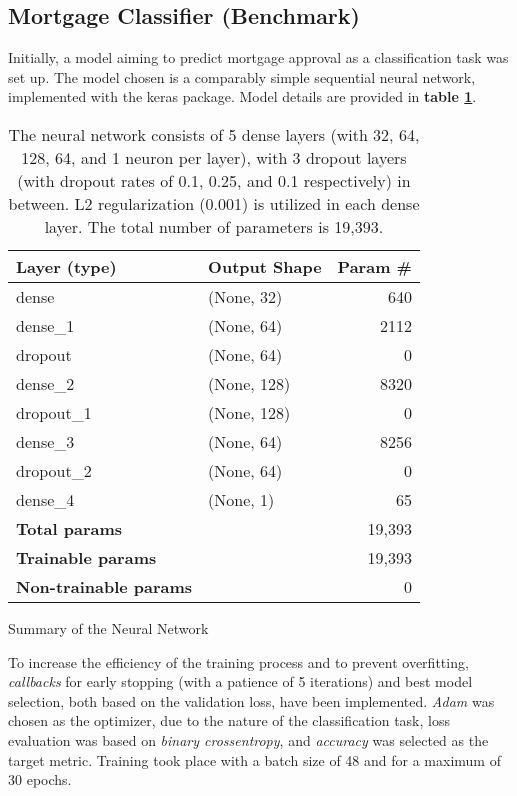 
\subsection{Mortgage Classifier (Benchmark)}\label{subsec:Model_Training_and_Prediction}

Initially, a model aiming to predict mortgage approval as a classification task was set up. The model chosen is a comparably simple sequential neural network, implemented with the keras package. Model details are provided in \textbf{table \ref{tab:CH03_Model_Details}}.

\begin{table}[h]
    \centering
    \begin{tabularx}{\textwidth}{lXr}
    \hline
    \textbf{Layer (type)} & \textbf{Output Shape} & \textbf{Param \#} \\
    \hline
    dense & (None, 32) & 640 \\
    dense\_1 & (None, 64) & 2112 \\
    dropout & (None, 64) & 0 \\
    dense\_2 & (None, 128) & 8320 \\
    dropout\_1 & (None, 128) & 0 \\
    dense\_3 & (None, 64) & 8256 \\
    dropout\_2 & (None, 64) & 0 \\
    dense\_4 & (None, 1) & 65 \\
    \hline
    \textbf{Total params} & & 19,393 \\
    \textbf{Trainable params} & & 19,393 \\
    \textbf{Non-trainable params} & & 0 \\
    \hline
    \end{tabularx}
    \caption{Summary of the Neural Network}
    \caption*{The neural network consists of 5 dense layers (with 32, 64, 128, 64, and 1 neuron per layer), with 3 dropout layers (with dropout rates of 0.1, 0.25, and 0.1 respectively) in between. L2 regularization (0.001) is utilized in each dense layer. The total number of parameters is 19,393.}
    \label{tab:CH03_Model_Details}
\end{table}

To increase the efficiency of the training process and to prevent overfitting, \textit{callbacks} for early stopping (with a patience of 5 iterations) and best model selection, both based on the validation loss, have been implemented. 
\textit{Adam} was chosen as the optimizer, due to the nature of the classification task, loss evaluation was based on \textit{binary crossentropy}, and \textit{accuracy} was selected as the target metric. Training took place with a batch size of 48 and for a maximum of 30 epochs. 


